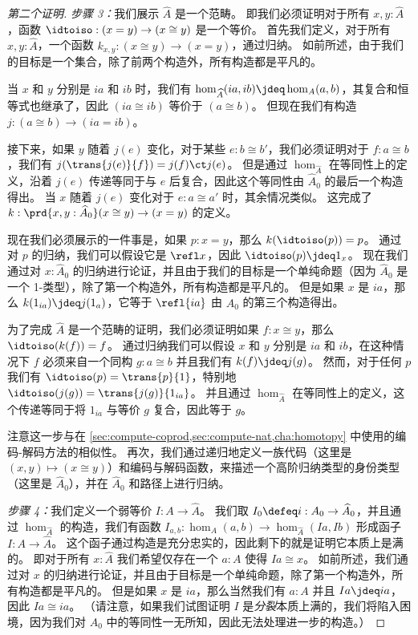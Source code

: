\begin{proof}[第二个证明]
  \mentalpause

  \emph{步骤 3：}我们展示 $\widehat A$ 是一个范畴。
  即我们必须证明对于所有 $x,y:\widehat A$，函数 $\idtoiso:(x=y) \to (x\cong y)$ 是一个等价。
  首先我们定义，对于所有 $x,y:\widehat A$，一个函数 $k_{x,y}:(x\cong y) \to (x=y)$，通过归纳。
  如前所述，由于我们的目标是一个集合，除了前两个构造外，所有构造都是平凡的。

  当 $x$ 和 $y$ 分别是 $ia$ 和 $ib$ 时，我们有 $\hom_{\widehat A}(ia,ib)\jdeq \hom_A(a,b)$，其复合和恒等式也继承了，因此 $(ia\cong ib)$ 等价于 $(a\cong b)$。
  但现在我们有构造 $j:(a\cong b) \to (ia=ib)$。

  接下来，如果 $y$ 随着 $j(e)$ 变化，对于某些 $e:b\cong b'$，我们必须证明对于 $f:a\cong b$，我们有 $j(\trans{j(e)}{f}) = j(f) \ct j(e)$。
  但是通过 $\hom_{\widehat A}$ 在等同性上的定义，沿着 $j(e)$ 传递等同于与 $e$ 后复合，因此这个等同性由 $\widehat A_0$ 的最后一个构造得出。
  当 $x$ 随着 $j(e)$ 变化对于 $e:a\cong a'$ 时，其余情况类似。
  这完成了 $k:\prd{x,y:\widehat A_0} (x\cong y) \to (x=y)$ 的定义。

  现在我们必须展示的一件事是，如果 $p:x=y$，那么 $k(\idtoiso(p))=p$。
  通过对 $p$ 的归纳，我们可以假设它是 $\refl x$，因此 $\idtoiso(p)\jdeq 1_x$。
  现在我们通过对 $x:\widehat A_0$ 的归纳进行论证，并且由于我们的目标是一个单纯命题（因为 $\widehat A_0$ 是一个 1-类型），除了第一个构造外，所有构造都是平凡的。
  但是如果 $x$ 是 $ia$，那么 $k(1_{ia}) \jdeq j(1_a)$，它等于 $\refl{ia}$ 由 $\widehat A_0$ 的第三个构造得出。

  为了完成 $\widehat A$ 是一个范畴的证明，我们必须证明如果 $f:x\cong y$，那么 $\idtoiso(k(f))=f$。
  通过归纳我们可以假设 $x$ 和 $y$ 分别是 $ia$ 和 $ib$，在这种情况下 $f$ 必须来自一个同构 $g:a\cong b$ 并且我们有 $k(f)\jdeq j(g)$。
  然而，对于任何 $p$ 我们有 $\idtoiso(p) = \trans{p}{1}$，特别地 $\idtoiso (j(g)) = \trans{j(g)}{1_{ia}}$。
  并且通过 $\hom_{\widehat A}$ 在等同性上的定义，这个传递等同于将 $1_{ia}$ 与等价 $g$ 复合，因此等于 $g$。

  注意这一步与在 \cref{sec:compute-coprod,sec:compute-nat,cha:homotopy} 中使用的编码-解码方法的相似性。
  再次，我们通过递归地定义一族代码（这里是 $(x,y)\mapsto (x\cong y)$）和编码与解码函数，来描述一个高阶归纳类型的身份类型（这里是 $\widehat A_0$），并在 $\widehat A_0$ 和路径上进行归纳。

  \mentalpause

  \emph{步骤 4：}我们定义一个弱等价 $I:A \to \widehat A$。
  我们取 $I_0 \defeq i : A_0 \to \widehat A_0$，并且通过 $\hom_{\widehat A}$ 的构造，我们有函数 $I_{a,b}:\hom_A(a,b) \to \hom_{\widehat A}(Ia,Ib)$ 形成函子 $I:A \to \widehat A$。
  这个函子通过构造是充分忠实的，因此剩下的就是证明它本质上是满的。
  即对于所有 $x:\widehat A$ 我们希望仅存在一个 $a:A$ 使得 $Ia\cong x$。
  如前所述，我们通过对 $x$ 的归纳进行论证，并且由于目标是一个单纯命题，除了第一个构造外，所有构造都是平凡的。
  但是如果 $x$ 是 $ia$，那么当然我们有 $a:A$ 并且 $Ia\jdeq ia$，因此 $Ia \cong ia$。
  （请注意，如果我们试图证明 $I$ 是\emph{分裂}本质上满的，我们将陷入困境，因为我们对 $A_0$ 中的等同性一无所知，因此无法处理进一步的构造。）
\end{proof}

